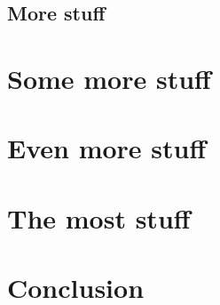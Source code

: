 \documentclass[12pt]{ociamthesis}\usepackage[]{graphicx}\usepackage[]{color}
\begin{document}
\lipsum

\section{More stuff}

\lipsum

\chapter{Some more stuff}

\lipsum

\chapter{Even more stuff}

\lipsum

\chapter{The most stuff}

\lipsum

\chapter{Conclusion}




\end{document}
